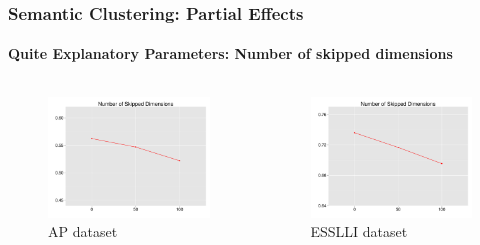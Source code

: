 \documentclass[t]{beamer} %
\begin{document}
\begin{frame}
  \frametitle{Semantic Clustering: Partial Effects}
  \framesubtitle{Quite Explanatory Parameters: Number of skipped dimensions}

  \vspace{-18pt}

  \begin{columns}
    
    \begin{column}{0.5\textwidth}
      \begin{figure} 
        \hspace*{-18pt} 
        \includegraphics[scale=0.30]{img/lapesa_ap_main_dimskip}
        \vspace{-10pt}
        \caption{AP dataset}
      \end{figure}
    \end{column}

    \begin{column}{0.5\textwidth}
      \centering
      
      \begin{figure}
        \hspace*{-18pt}   
        \includegraphics[scale=0.30]{img/lapesa_esslli_main_dimskip}
        \vspace{-10pt}
        \caption{ESSLLI dataset}
      \end{figure}
      

\end{column}
\end{columns}
\end{frame}
\end{document}

